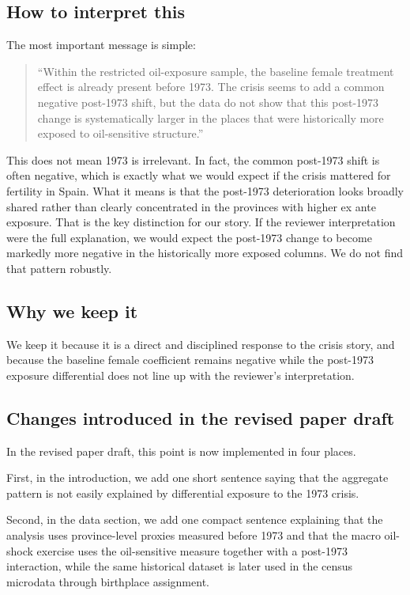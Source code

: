 \documentclass[11pt]{article}
\begin{document}
\subsection*{How to interpret this}

The most important message is simple:

\begin{quote}
``Within the restricted oil-exposure sample, the baseline female treatment effect is already present before 1973. The crisis seems to add a common negative post-1973 shift, but the data do not show that this post-1973 change is systematically larger in the places that were historically more exposed to oil-sensitive structure.''
\end{quote}

This does not mean 1973 is irrelevant. In fact, the common post-1973 shift is often negative, which is exactly what we would expect if the crisis mattered for fertility in Spain. What it means is that the post-1973 deterioration looks broadly shared rather than clearly concentrated in the provinces with higher ex ante exposure. That is the key distinction for our story. If the reviewer interpretation were the full explanation, we would expect the post-1973 change to become markedly more negative in the historically more exposed columns. We do not find that pattern robustly.

\subsection*{Why we keep it}

We keep it because it is a direct and disciplined response to the crisis story, and because the baseline female coefficient remains negative while the post-1973 exposure differential does not line up with the reviewer's interpretation.

\subsection*{Changes introduced in the revised paper draft}

In the revised paper draft, this point is now implemented in four places.

First, in the introduction, we add one short sentence saying that the aggregate pattern is not easily explained by differential exposure to the 1973 crisis.

Second, in the data section, we add one compact sentence explaining that the analysis uses province-level proxies measured before 1973 and that the macro oil-shock exercise uses the oil-sensitive measure together with a post-1973 interaction, while the same historical dataset is later used in the census microdata through birthplace assignment.
\end{document}

